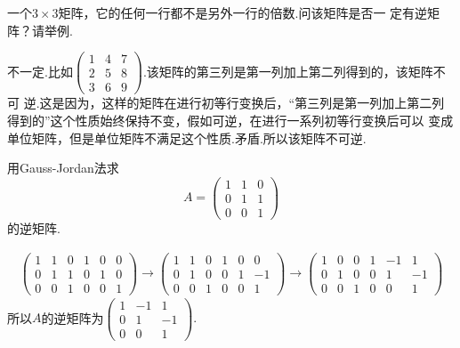 ﻿\documentclass{book} \usepackage{exsheets} \usepackage{xeCJK}
\begin{document}
\begin{question}
  一个$3\times 3$矩阵，它的任何一行都不是另外一行的倍数.问该矩阵是否一
  定有逆矩阵？请举例.
\end{question}
\begin{solution}
  不一定.比如$
  \begin{pmatrix}
    1&4&7\\
    2&5&8\\
    3&6&9
  \end{pmatrix}.  $该矩阵的第三列是第一列加上第二列得到的，该矩阵不可
  逆.这是因为，这样的矩阵在进行初等行变换后，“第三列是第一列加上第二列
  得到的”这个性质始终保持不变，假如可逆，在进行一系列初等行变换后可以
  变成单位矩阵，但是单位矩阵不满足这个性质.矛盾.所以该矩阵不可逆.
\end{solution}
\begin{question}
  用Gauss-Jordan法求
$$
A=
\begin{pmatrix}
  1&1&0\\
  0&1&1\\
  0&0&1
\end{pmatrix}
$$
的逆矩阵.
\end{question}
\begin{solution}
  \begin{align*}
    \begin{pmatrix}
      1&1&0&1&0&0\\
      0&1&1&0&1&0\\
      0&0&1&0&0&1
    \end{pmatrix}\to
                 \begin{pmatrix}
                   1&1&0&1&0&0\\
                   0&1&0&0&1&-1\\
                   0&0&1&0&0&1
                 \end{pmatrix}\to
                              \begin{pmatrix}
                                1&0&0&1&-1&1\\
                                0&1&0&0&1&-1\\
                                0&0&1&0&0&1
                              \end{pmatrix}
  \end{align*}
所以$A$的逆矩阵为$
\begin{pmatrix}
  1&-1&1\\
0&1&-1\\
0&0&1
\end{pmatrix}.
$
\end{solution}
\end{document}
